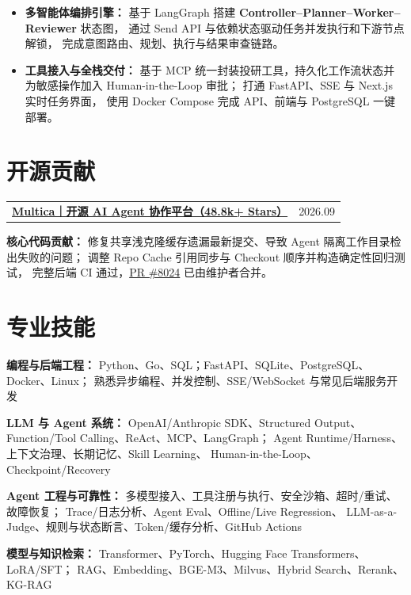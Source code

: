 \documentclass[a4paper,10pt]{article}
\newcommand{\resumeItem}[1]{\item #1}
\newcommand{\skill}[2]{%
    \textbf{#1：}#2\par\vspace{1.5pt}
}
\begin{document}
\begin{itemize}

\resumeItem{
    \textbf{多智能体编排引擎：}
    基于 LangGraph 搭建
    \textbf{Controller--Planner--Worker--Reviewer} 状态图，
    通过 Send API 与依赖状态驱动任务并发执行和下游节点解锁，
    完成意图路由、规划、执行与结果审查链路。
}

\resumeItem{
    \textbf{工具接入与全栈交付：}
    基于 MCP 统一封装投研工具，持久化工作流状态并为敏感操作加入
    Human-in-the-Loop 审批；
    打通 FastAPI、SSE 与 Next.js 实时任务界面，
    使用 Docker Compose 完成 API、前端与 PostgreSQL 一键部署。
}

\end{itemize}


\section{开源贡献}

\begin{tabularx}{\textwidth}{@{}X>{\raggedleft\arraybackslash}p{}@{}}
    \textbf{\large
        \href{https://github.com/multica-ai/multica}
        {Multica｜开源 AI Agent 协作平台（48.8k+ Stars）}}
    &
    \textcolor{muted}{2026.09}
\end{tabularx}

\vspace{1pt}

\textbf{核心代码贡献：}
修复共享浅克隆缓存遗漏最新提交、导致 Agent 隔离工作目录检出失败的问题；
调整 Repo Cache 引用同步与 Checkout 顺序并构造确定性回归测试，
完整后端 CI 通过，\href{https://github.com/multica-ai/multica/pull/8024}{PR \#8024} 已由维护者合并。


\section{专业技能}

\skill{编程与后端工程}{
    Python、Go、SQL；FastAPI、SQLite、PostgreSQL、Docker、Linux；
    熟悉异步编程、并发控制、SSE/WebSocket 与常见后端服务开发
}

\skill{LLM 与 Agent 系统}{
    OpenAI/Anthropic SDK、Structured Output、Function/Tool Calling、ReAct、MCP、LangGraph；
    Agent Runtime/Harness、上下文治理、长期记忆、Skill Learning、
    Human-in-the-Loop、Checkpoint/Recovery
}

\skill{Agent 工程与可靠性}{
    多模型接入、工具注册与执行、安全沙箱、超时/重试、故障恢复；
    Trace/日志分析、Agent Eval、Offline/Live Regression、
    LLM-as-a-Judge、规则与状态断言、Token/缓存分析、GitHub Actions
}

\skill{模型与知识检索}{
    Transformer、PyTorch、Hugging Face Transformers、LoRA/SFT；
    RAG、Embedding、BGE-M3、Milvus、Hybrid Search、Rerank、KG-RAG
}
\end{document}
